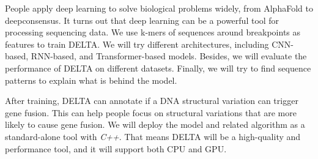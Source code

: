 \documentclass{article}
\begin{document}
People apply deep learning to solve biological problems widely, from AlphaFold to deepconsensus.
It turns out that deep learning can be a powerful tool for processing sequencing data.
We use k-mers of sequences around breakpoints as features to train DELTA\@.
We will try different architectures, including CNN-based, RNN-based, and Transformer-based models.
Besides, we will evaluate the performance of DELTA on different datasets.
Finally, we will try to find sequence patterns to explain what is behind the model.

After training, DELTA can annotate if a DNA structural variation can trigger gene fusion.
This can help people focus on structural variations that are more likely to cause gene fusion.
We will deploy the model and related algorithm as a standard-alone tool with \textit{C++}.
That means DELTA will be a high-quality and performance tool, and it will support both CPU and GPU\@.






% 
% 
\end{document}

